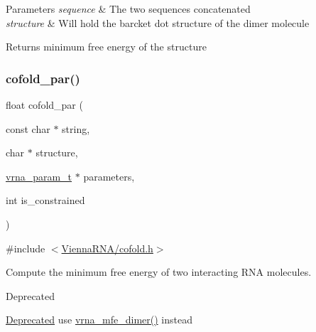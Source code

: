 \begin{DoxyParams}{Parameters}
{\em sequence} & The two sequences concatenated \\
\hline
{\em structure} & Will hold the barcket dot structure of the dimer molecule \\
\hline
\end{DoxyParams}
\begin{DoxyReturn}{Returns}
minimum free energy of the structure 
\end{DoxyReturn}
\mbox{\label{group__mfe__global__deprecated_ga7612cfeeb1b793f1e4179b1eb53df1f3}} 
\subsubsection{\texorpdfstring{cofold\+\_\+par()}{cofold\_par()}}
{\footnotesize\ttfamily float cofold\+\_\+par (\begin{DoxyParamCaption}\item[{const char $\ast$}]{string,  }\item[{char $\ast$}]{structure,  }\item[{\hyperlink{group__energy__parameters_ga8a69ca7d787e4fd6079914f5343a1f35}{vrna\+\_\+param\+\_\+t} $\ast$}]{parameters,  }\item[{int}]{is\+\_\+constrained }\end{DoxyParamCaption})}



{\ttfamily \#include $<$\hyperlink{cofold_8h}{Vienna\+R\+N\+A/cofold.\+h}$>$}



Compute the minimum free energy of two interacting R\+NA molecules. 

\begin{DoxyRefDesc}{Deprecated}
\item[\hyperlink{deprecated__deprecated000031}{Deprecated}]use \hyperlink{group__mfe__global_gaab22d10c1190f205f16a77cab9d5d3ee}{vrna\+\_\+mfe\+\_\+dimer()} instead\end{DoxyRefDesc}
\mbox{\label{group__mfe__global__deprecated_gaafb33d7473eb9af9d1b168ca8761c41a}} 
